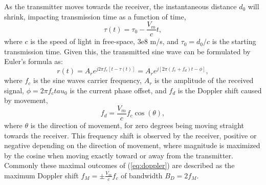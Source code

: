 As the transmitter moves towards the receiver, the instantaneous distance $d_0$ will shrink, impacting transmission time as a function of time,
\begin{equation}
\label{eq:delayt}
\tau(t) = \tau_0 - \frac{V_m}{c}t,
\end{equation}
where $c$ is the speed of light in free-space, 3e8 m/s, and $\tau_0=d_0/c$ is the starting transmission time. Given this, the transmitted sine wave can be formulated by Euler's formula as:
\begin{equation}
\label{eq:doppsig}
r(t) = A_r e^{j2\pi f_c [t - \tau(t) ]} = A_r e^{j[2\pi (f_c+f_d)t-\phi ]},
\end{equation}
where $f_c$ is the sine waves carrier frequency, $A_r$ is the amplitude of the received signal, $\phi=2\pi f_c tau_0$ is the current phase offset, and $f_d$ is the Doppler shift caused by movement,
\begin{equation}
\label{eq:doppler}
f_d = \frac{V_m}{c} f_c \cos(\theta),
\end{equation}
where $\theta$ is the direction of movement, for zero degrees being moving straight towards the receiver. This frequency shift is observed by the receiver, positive or negative depending on the direction of movement, where magnitude is maximized by the cosine when moving exactly toward or away from the transmitter. Commonly these maximal outcomes of (\ref{eq:doppler}) are described as the maximum Doppler shift $f_M = \pm \frac{V_m}{c} f_c$ of bandwidth $B_D = 2f_M$.

